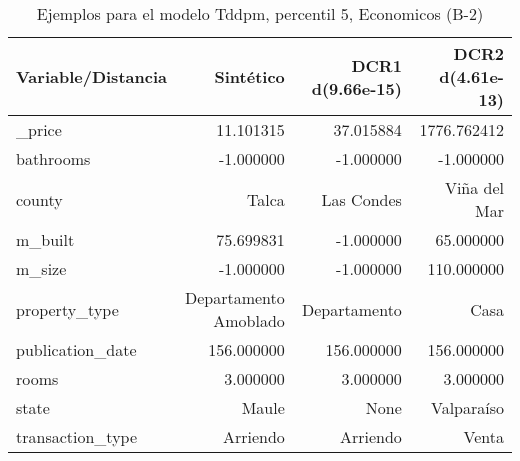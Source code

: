 \begin{table}[H]
\centering
\fontsize{10}{14}\selectfont
\caption{Ejemplos para el modelo Tddpm, percentil 5, Economicos (B-2)}
\label{table-example-economicos-b-2-tddpm_mlp-5p}
\begin{tabular}{|l|r|r|r|}
\hline
\rowcolor[gray]{0.8}
Variable/Distancia & Sintético & DCR1 d(9.66e-15) & DCR2 d(4.61e-13) \\
\hline \_price & \cellcolor[rgb]{0.9, 0.54, 0.52} 11.101315 & 37.015884 & 1776.762412 \\
\hline bathrooms & \cellcolor[rgb]{0.9, 0.54, 0.52} -1.000000 & \cellcolor[rgb]{0.9, 0.54, 0.52} -1.000000 & \cellcolor[rgb]{0.9, 0.54, 0.52} -1.000000 \\
\hline county & \cellcolor[rgb]{0.9, 0.54, 0.52} Talca & Las Condes & Viña del Mar \\
\hline m\_built & \cellcolor[rgb]{0.9, 0.54, 0.52} 75.699831 & -1.000000 & 65.000000 \\
\hline m\_size & \cellcolor[rgb]{0.9, 0.54, 0.52} -1.000000 & \cellcolor[rgb]{0.9, 0.54, 0.52} -1.000000 & 110.000000 \\
\hline property\_type & \cellcolor[rgb]{0.9, 0.54, 0.52} Departamento Amoblado & Departamento & Casa \\
\hline publication\_date & \cellcolor[rgb]{0.9, 0.54, 0.52} 156.000000 & \cellcolor[rgb]{0.9, 0.54, 0.52} 156.000000 & \cellcolor[rgb]{0.9, 0.54, 0.52} 156.000000 \\
\hline rooms & \cellcolor[rgb]{0.9, 0.54, 0.52} 3.000000 & \cellcolor[rgb]{0.9, 0.54, 0.52} 3.000000 & \cellcolor[rgb]{0.9, 0.54, 0.52} 3.000000 \\
\hline state & \cellcolor[rgb]{0.9, 0.54, 0.52} Maule & None & Valparaíso \\
\hline transaction\_type & \cellcolor[rgb]{0.9, 0.54, 0.52} Arriendo & \cellcolor[rgb]{0.9, 0.54, 0.52} Arriendo & Venta \\
\hline
\end{tabular}
\end{table}

